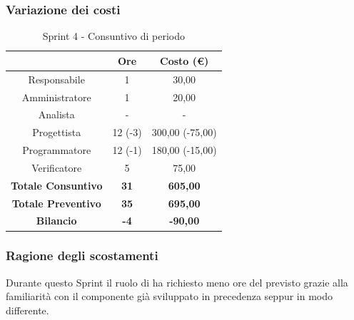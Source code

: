 \subsubsection{Variazione dei costi} \label{subsubsection:variazione_costi_sprint4}

\begin{table}[H]
  \centering
  \renewcommand{\arraystretch}{1.8}
  \begin{tabular}{c|c|c}
    \rowcolor[HTML]{125E28}
    \multicolumn{1}{c}{\color[HTML]{FFFFFF}\textbf{Ruolo}} &
    \multicolumn{1}{c}{\color[HTML]{FFFFFF}\textbf{Ore}}   &
    \multicolumn{1}{c}{\color[HTML]{FFFFFF}\textbf{Costo (€)}}                             \\
    \hline
    Responsabile                                           & 1           & 30,00           \\
    Amministratore                                         & 1           & 20,00           \\
    Analista                                               & -           & -               \\
    Progettista                                            & 12 (-3)     & 300,00 (-75,00) \\
    Programmatore                                          & 12 (-1)     & 180,00 (-15,00) \\
    Verificatore                                           & 5           & 75,00           \\
    \textbf{Totale Consuntivo}                             & \textbf{31} & \textbf{605,00} \\
    \textbf{Totale Preventivo}                             & \textbf{35} & \textbf{695,00} \\
    \textbf{Bilancio}                                      & \textbf{-4} & \textbf{-90,00} \\
  \end{tabular}
  \caption{Sprint 4 - Consuntivo di periodo}
\end{table}

\subsubsection{Ragione degli scostamenti} \label{subsubsection:ragione_scostamenti_sprint4}
Durante questo Sprint\glo{} il ruolo di \roleDesignerLow{} ha richiesto meno ore del previsto grazie alla familiarità con il componente già sviluppato in precedenza seppur in modo differente.


